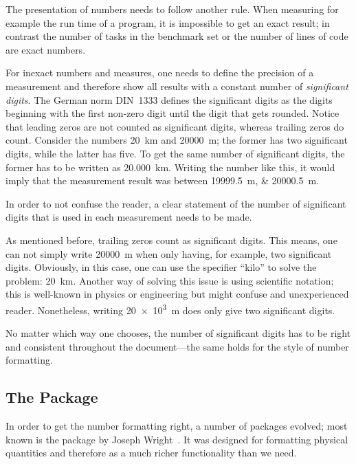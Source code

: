 The presentation of numbers needs to follow another rule.  When measuring for
example the run time of a program, it is impossible to get an exact result; in
contrast the number of tasks in the benchmark set or the number of lines of code
are exact numbers.

For inexact numbers and measures, one needs to define the precision of a
measurement and therefore show all results with a constant number of
\emph{significant digits}.  The German norm DIN~1333 defines the significant
digits as the digits beginning with the first non-zero digit until the digit
that gets rounded.  Notice that leading zeros are not counted as significant
digits, whereas trailing zeros do count.  Consider the numbers
\SI{20}{\kilo\meter} and \SI{20000}{\meter}; the former has two significant
digits, while the latter has five.  To get the same number of significant
digits, the former has to be written as \SI{20.000}{\kilo\meter}.  Writing the
number like this, it would imply that the measurement result was between
\SIlist{19999.5;20000.5}{\meter}.

In order to not confuse the reader, a clear statement of the number of
significant digits that is used in each measurement needs to be made.

As mentioned before, trailing zeros count as significant digits.  This means,
one can not simply write \SI{20000}{\meter} when only having, for example, two
significant digits.  Obviously, in this case, one can use the specifier
\enquote{kilo} to solve the problem: \SI{20}{\kilo\meter}.  Another way of
solving this issue is using scientific notation; this is well-known in physics
or engineering but might confuse and unexperienced reader.  Nonetheless, writing
\SI{20e3}{\meter} does only give two significant digits.

No matter which way one chooses, the number of significant digits has to be
right and consistent throughout the document—the same holds for the style of
number formatting.

\subsection{The Package }

In order to get the number formatting right, a number of packages evolved; most
known is the  package by Joseph Wright~\cite{Wright2016}.  It
was designed for formatting physical quantities and therefore as a much richer
functionality than we need.

